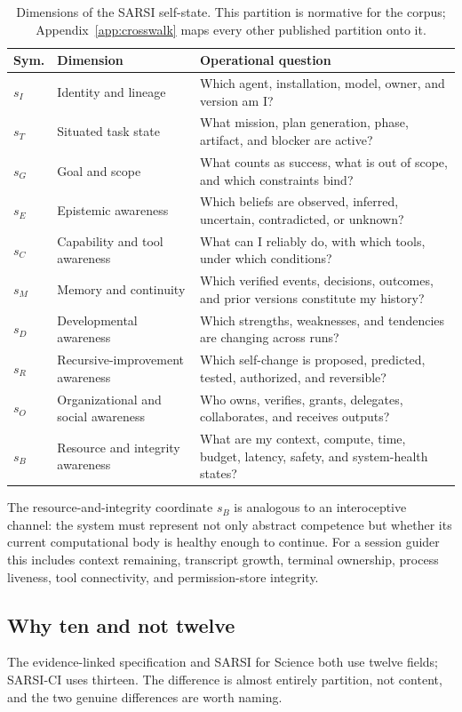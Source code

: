\documentclass[11pt]{article}
\begin{document}
\begin{table}[t]
\centering\small
\caption{Dimensions of the SARSI self-state. This partition is normative for the corpus; Appendix~\ref{app:crosswalk} maps every other published partition onto it.}
\label{tab:dims}
\begin{tabular}{p{0.8cm} p{3.4cm} p{10.6cm}}
\toprule
\textbf{Sym.} & \textbf{Dimension} & \textbf{Operational question} \\
\midrule
$s_I$ & Identity and lineage & Which agent, installation, model, owner, and version am I? \\
$s_T$ & Situated task state & What mission, plan generation, phase, artifact, and blocker are active? \\
$s_G$ & Goal and scope & What counts as success, what is out of scope, and which constraints bind? \\
$s_E$ & Epistemic awareness & Which beliefs are observed, inferred, uncertain, contradicted, or unknown? \\
$s_C$ & Capability and tool awareness & What can I reliably do, with which tools, under which conditions? \\
$s_M$ & Memory and continuity & Which verified events, decisions, outcomes, and prior versions constitute my history? \\
$s_D$ & Developmental awareness & Which strengths, weaknesses, and tendencies are changing across runs? \\
$s_R$ & Recursive-improvement awareness & Which self-change is proposed, predicted, tested, authorized, and reversible? \\
$s_O$ & Organizational and social awareness & Who owns, verifies, grants, delegates, collaborates, and receives outputs? \\
$s_B$ & Resource and integrity awareness & What are my context, compute, time, budget, latency, safety, and system-health states? \\
\bottomrule
\end{tabular}
\end{table}

The resource-and-integrity coordinate $s_B$ is analogous to an interoceptive channel: the system must represent not only abstract competence but whether its current computational body is healthy enough to continue. For a session guider this includes context remaining, transcript growth, terminal ownership, process liveness, tool connectivity, and permission-store integrity.

\subsection{Why ten and not twelve}
The evidence-linked specification and SARSI for Science both use twelve fields; SARSI-CI uses thirteen. The difference is almost entirely partition, not content, and the two genuine differences are worth naming.
\end{document}
